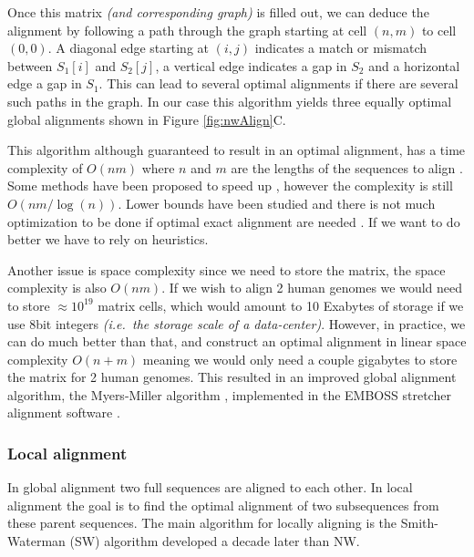 \documentclass[
  11pt,
  twoside]{scrbook}
\begin{document}
Once this matrix \emph{(and corresponding graph)} is filled out, we can deduce the alignment by following a path through the graph starting at cell \((n,m)\) to cell \((0,0)\). A diagonal edge starting at \((i,j)\) indicates a match or mismatch between \(S_1[i]\) and \(S_2[j]\), a vertical edge indicates a gap in \(S_2\) and a horizontal edge a gap in \(S_1\). This can lead to several optimal alignments if there are several such paths in the graph. In our case this algorithm yields three equally optimal global alignments shown in Figure \ref{fig:nwAlign}C.

This algorithm although guaranteed to result in an optimal alignment, has a time complexity of \(O(nm)\) where \(n\) and \(m\) are the lengths of the sequences to align \autocite{sungAlgorithmsBioinformaticsPractical2011}. Some methods have been proposed to speed up \autocite{masekFasterAlgorithmComputing1980}, however the complexity is still \(O(nm/\log(n))\). Lower bounds have been studied and there is not much optimization to be done if optimal exact alignment are needed \autocite{vinhInformationTheoreticMeasures2010,ullmanBoundsComplexityLongest1976}. If we want to do better we have to rely on heuristics.

Another issue is space complexity since we need to store the matrix, the space complexity is also \(O(nm)\). If we wish to align 2 human genomes we would need to store \(\approx 10^{19}\) matrix cells, which would amount to 10 Exabytes of storage if we use 8bit integers \emph{(i.e.~the storage scale of a data-center)}. However, in practice, we can do much better than that, and construct an optimal alignment in linear space complexity \(O(n+m)\) \autocite{hirschbergLinearSpaceAlgorithm1975} meaning we would only need a couple gigabytes to store the matrix for 2 human genomes. This resulted in an improved global alignment algorithm, the Myers-Miller algorithm \autocite{myersOptimalAlignmentsLinear1988}, implemented in the EMBOSS stretcher alignment software \autocite{riceEMBOSSEuropeanMolecular2000}.

\hypertarget{local-alignment}{%
\subsubsection{Local alignment}\label{local-alignment}}

In global alignment two full sequences are aligned to each other. In local alignment the goal is to find the optimal alignment of two subsequences from these parent sequences. The main algorithm for locally aligning is the Smith-Waterman (SW) algorithm \autocite{smithIdentificationCommonMolecular1981} developed a decade later than NW.
\end{document}
